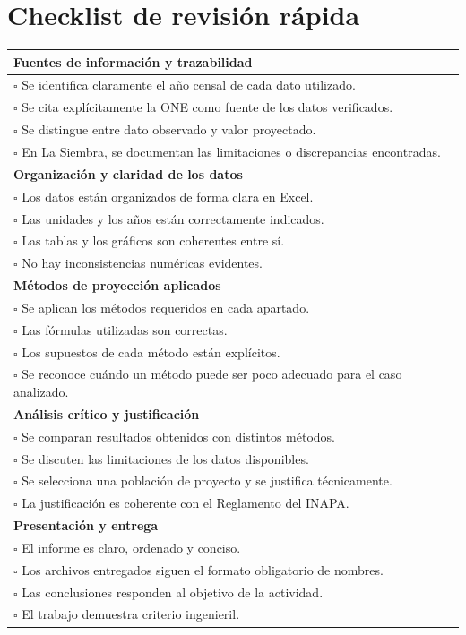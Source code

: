\documentclass[12pt]{article}
\begin{document}
\section{Checklist de revisión rápida}
\begin{longtable}{p{}}
\toprule
\textbf{Fuentes de información y trazabilidad} \\
\midrule
$\square$ Se identifica claramente el año censal de cada dato utilizado. \\
$\square$ Se cita explícitamente la ONE como fuente de los datos verificados. \\
$\square$ Se distingue entre dato observado y valor proyectado. \\
$\square$ En La Siembra, se documentan las limitaciones o discrepancias encontradas. \\
\midrule
\textbf{Organización y claridad de los datos} \\
\midrule
$\square$ Los datos están organizados de forma clara en Excel. \\
$\square$ Las unidades y los años están correctamente indicados. \\
$\square$ Las tablas y los gráficos son coherentes entre sí. \\
$\square$ No hay inconsistencias numéricas evidentes. \\
\midrule
\textbf{Métodos de proyección aplicados} \\
\midrule
$\square$ Se aplican los métodos requeridos en cada apartado. \\
$\square$ Las fórmulas utilizadas son correctas. \\
$\square$ Los supuestos de cada método están explícitos. \\
$\square$ Se reconoce cuándo un método puede ser poco adecuado para el caso analizado. \\
\midrule
\textbf{Análisis crítico y justificación} \\
\midrule
$\square$ Se comparan resultados obtenidos con distintos métodos. \\
$\square$ Se discuten las limitaciones de los datos disponibles. \\
$\square$ Se selecciona una población de proyecto y se justifica técnicamente. \\
$\square$ La justificación es coherente con el Reglamento del INAPA. \\
\midrule
\textbf{Presentación y entrega} \\
\midrule
$\square$ El informe es claro, ordenado y conciso. \\
$\square$ Los archivos entregados siguen el formato obligatorio de nombres. \\
$\square$ Las conclusiones responden al objetivo de la actividad. \\
$\square$ El trabajo demuestra criterio ingenieril. \\
\bottomrule
\end{longtable}
\end{document}
